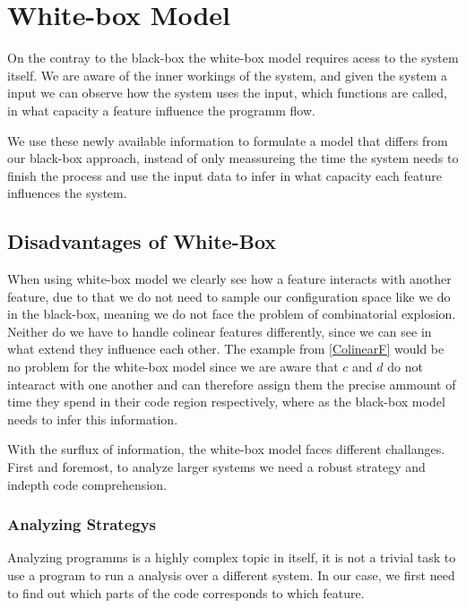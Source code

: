 \chapter{White-box Model}\label{ch:Whitebox}


On the contray to the black-box the white-box model requires acess to the system itself. 
We are aware of the inner workings of the system, and given the system a input we can observe how the system uses the input, which functions are called, 
in what capacity a feature influence the programm flow. 

We use these newly available information to formulate a model that differs from our black-box approach, instead of only meassureing the time the system
needs to finish the process and use the input data to infer in what capacity each feature influences the system. 

\section{Disadvantages of White-Box}
When using white-box model we clearly see how a feature interacts with another feature, due to that we do not need to sample our configuration space like
we do in the black-box, meaning we do not face the problem of combinatorial explosion. 
Neither do we have to handle colinear features differently, since we can see in what extend they influence each other. 
The example from \ref{ColinearF} would be no problem for the white-box model since we are aware that $c$ and $d$ do not intearact with one another and can
therefore assign them the precise ammount of time they spend in their code region respectively, where as the black-box model needs to infer this information.

With the surflux of information, the white-box model faces different challanges. 
First and foremost, to analyze larger systems we need a robust strategy and indepth code comprehension.

\subsection{Analyzing Strategys}
Analyzing programms is a highly complex topic in itself, it is not a trivial task to use a program to run a analysis over a different system.
In our case, we first need to find out which parts of the code corresponds to which feature.

